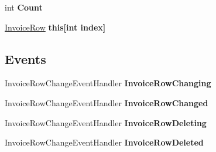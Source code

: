 \begin{DoxyCompactItemize}
\item 
int {\bfseries Count}\hypertarget{class_products_1_1_data_1_1ds_sage_1_1_invoice_data_table_a407b7867359204e4f27a17fcc9220ebe}{}\label{class_products_1_1_data_1_1ds_sage_1_1_invoice_data_table_a407b7867359204e4f27a17fcc9220ebe}

\item 
\hyperlink{class_products_1_1_data_1_1ds_sage_1_1_invoice_row}{Invoice\+Row} {\bfseries this\mbox{[}int index\mbox{]}}\hypertarget{class_products_1_1_data_1_1ds_sage_1_1_invoice_data_table_afc3867184bf8a25e56060b07534854ed}{}\label{class_products_1_1_data_1_1ds_sage_1_1_invoice_data_table_afc3867184bf8a25e56060b07534854ed}

\end{DoxyCompactItemize}
\subsection*{Events}
\begin{DoxyCompactItemize}
\item 
Invoice\+Row\+Change\+Event\+Handler {\bfseries Invoice\+Row\+Changing}\hypertarget{class_products_1_1_data_1_1ds_sage_1_1_invoice_data_table_a9754471396a4c1beff758e65025b782a}{}\label{class_products_1_1_data_1_1ds_sage_1_1_invoice_data_table_a9754471396a4c1beff758e65025b782a}

\item 
Invoice\+Row\+Change\+Event\+Handler {\bfseries Invoice\+Row\+Changed}\hypertarget{class_products_1_1_data_1_1ds_sage_1_1_invoice_data_table_a5852035626ad28d35abbb945e694a111}{}\label{class_products_1_1_data_1_1ds_sage_1_1_invoice_data_table_a5852035626ad28d35abbb945e694a111}

\item 
Invoice\+Row\+Change\+Event\+Handler {\bfseries Invoice\+Row\+Deleting}\hypertarget{class_products_1_1_data_1_1ds_sage_1_1_invoice_data_table_a57ddee291d0c26fc5943a10a6117355e}{}\label{class_products_1_1_data_1_1ds_sage_1_1_invoice_data_table_a57ddee291d0c26fc5943a10a6117355e}

\item 
Invoice\+Row\+Change\+Event\+Handler {\bfseries Invoice\+Row\+Deleted}\hypertarget{class_products_1_1_data_1_1ds_sage_1_1_invoice_data_table_a98306aca44066ddada4ea0ba20f78ab2}{}\label{class_products_1_1_data_1_1ds_sage_1_1_invoice_data_table_a98306aca44066ddada4ea0ba20f78ab2}

\end{DoxyCompactItemize}


